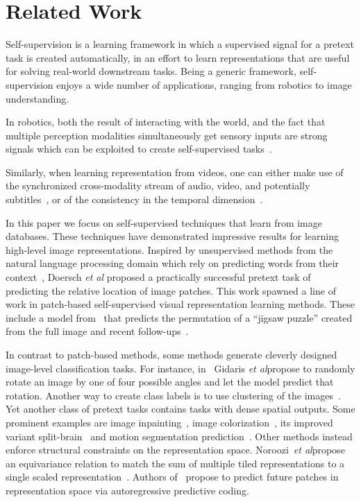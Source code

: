 \documentclass[10pt,twocolumn,letterpaper]{article}
\def\etal{\emph{et al}\onedot}
\begin{document}
\section{Related Work}\label{sec:related_work}

Self-supervision is a learning framework in which a supervised signal for a pretext task is created automatically, in an effort to learn representations that are useful for solving real-world downstream tasks.
Being a generic framework, self-supervision enjoys a wide number of applications, ranging from robotics to image understanding.


In robotics, both the result of interacting with the world, and the fact that multiple perception modalities simultaneously get sensory inputs are strong signals which can be exploited to create self-supervised tasks~\cite{jang2018grasp2vec, sermanet2017time, lee2018making, ebert2018robustness}.


Similarly, when learning representation from videos, one can either make use of the synchronized cross-modality stream of audio, video, and potentially subtitles~\cite{owens2018audio, sayed2018cross, korbar2018cooperative, wiles2018self}, or of the consistency in the temporal dimension~\cite{sermanet2017time}.

In this paper we focus on self-supervised techniques that learn from image databases.
These techniques have demonstrated impressive results for learning high-level image representations.
Inspired by unsupervised methods from the natural language processing domain which rely on predicting words from their context~\cite{mikolov2013efficient}, Doersch \etal \cite{doersch2015unsupervised} proposed a practically successful pretext task of predicting the relative location of image patches.
This work spawned a line of work in patch-based self-supervised visual representation learning methods.
These include a model from~\cite{noroozi2016unsupervised} that predicts the permutation of a ``jigsaw puzzle'' created from the full image and recent follow-ups~\cite{mundhenk2018improvements,noroozi2018boosting}.


In contrast to patch-based methods, some methods generate cleverly designed image-level classification tasks.
For instance, in~\cite{gidaris2018unsupervised} Gidaris \etal propose to randomly rotate an image by one of four possible angles and let the model predict that rotation.
Another way to create class labels is to use clustering of the images~\cite{caron2018deep}. 
Yet another class of pretext tasks contains tasks with dense spatial outputs.
Some prominent examples are image inpainting~\cite{pathakCVPR16context}, image colorization~\cite{zhang2016colorful}, its improved variant split-brain~\cite{zhang2017split} and motion segmentation prediction~\cite{pathak2017learning}.
Other methods instead enforce structural constraints on the representation space.
Noroozi~\etal propose an equivariance relation to match the sum of multiple tiled representations to a single scaled representation~\cite{noroozi2017representation}.
Authors of~\cite{oord2018representation} propose to predict future patches in representation space via autoregressive predictive coding.
\end{document}
